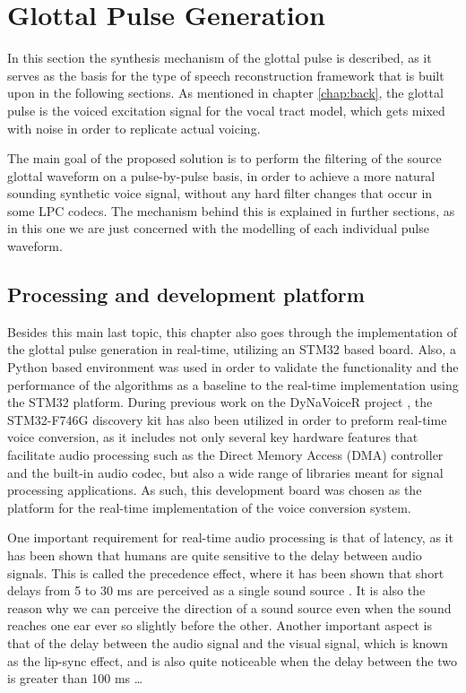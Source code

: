 \chapter{Glottal Pulse Generation}
\label{chap:pulseGen}

In this section the synthesis mechanism of the glottal pulse is described, as it serves as the basis for the type of speech reconstruction framework that is built upon in the following sections. As mentioned in chapter \ref{chap:back}, the glottal pulse is the voiced excitation signal for the vocal tract model, which gets mixed with noise in order to replicate actual voicing. %

The main goal of the proposed solution is to perform the filtering of the source glottal waveform on a pulse-by-pulse basis, in order to achieve a more natural sounding synthetic voice signal, without any hard filter changes that occur in some LPC codecs. The mechanism behind this is explained in further sections, as in this one we are just concerned with the modelling of each individual pulse waveform.

\section{Processing and development platform}

Besides this main last topic, this chapter also goes through the implementation of the glottal pulse generation in real-time, utilizing an STM32 based board. Also, a Python based environment was used in order to validate the functionality and the performance of the algorithms as a baseline to the real-time implementation using the STM32 platform. During previous work on the DyNaVoiceR project \cite{goncalvesVozeamentoSinteticoVoz2023}, the STM32-F746G discovery kit \cite{stmicroelectronicsSTM32F746NGDiscoveryKit} has also been utilized in order to preform real-time voice conversion, as it includes not only several key hardware features that facilitate audio processing such as the Direct Memory Access (DMA) controller and the built-in audio codec, but also a wide range of libraries meant for signal processing applications. As such, this development board was chosen as the platform for the real-time implementation of the voice conversion system.

One important requirement for real-time audio processing is that of latency, as it has been shown that humans are quite sensitive to the delay between audio signals. This is called the precedence effect, where it has been shown that short delays from 5 to 30 ms are perceived as a single sound source \cite{Litovsky1999ThePE}. It is also the reason why we can perceive the direction of a sound source even when the sound reaches one ear ever so slightly before the other. Another important aspect is that of the delay between the audio signal and the visual signal, which is known as the lip-sync effect, and is also quite noticeable when the delay between the two is greater than 100 ms \dots

